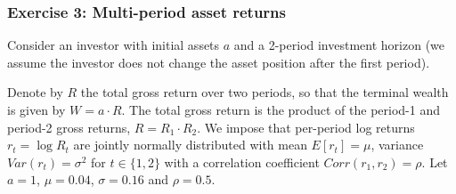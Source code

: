 \documentclass{scrartcl}
\begin{document}
    \hypertarget{exercise-3-multi-period-asset-returns}{%
\subsubsection{Exercise 3: Multi-period asset
returns}\label{exercise-3-multi-period-asset-returns}}

Consider an investor with initial assets \(a\) and a 2-period investment
horizon (we assume the investor does not change the asset position after
the first period).

Denote by \(R\) the total gross return over two periods, so that the
terminal wealth is given by \(W = a\cdot R\). The total gross return is
the product of the period-1 and period-2 gross returns,
\(R = R_1\cdot R_2\). We impose that per-period log returns
\(r_t = \log R_t\) are jointly normally distributed with mean
\(E[r_t] = \mu\), variance \(Var(r_t) = \sigma^2\) for \(t\in\{1,2\}\)
with a correlation coefficient \(Corr(r_1,r_2) = \rho\). Let \(a = 1\),
\(\mu = 0.04\), \(\sigma = 0.16\) and \(\rho = 0.5\).
\end{document}
